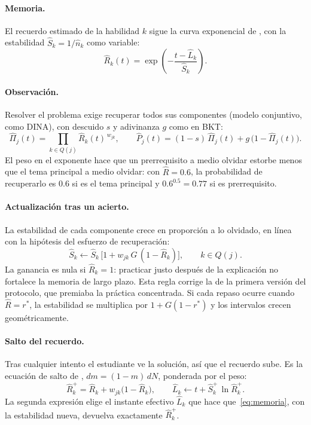 \documentclass[12pt]{article}
\theoremstyle{definition}
\newcommand{\Rh}{\hat R}
\newcommand{\Sh}{\hat S}
\newcommand{\Lh}{\hat L}
\newcommand{\Pih}{\hat\Pi}
\newcommand{\rstar}{r^{\ast}}
\begin{document}
\paragraph{Memoria.} El recuerdo estimado de la habilidad $k$ sigue la curva exponencial de \citet{tabibian2019}, con la estabilidad $\Sh_k=1/\hat n_k$ como variable:
\begin{equation}
\Rh_k(t)=\exp\!\left(-\frac{t-\Lh_k}{\Sh_k}\right).
\label{eq:memoria}
\end{equation}

\paragraph{Observación.} Resolver el problema exige recuperar todos sus componentes (modelo conjuntivo, como DINA), con descuido $s$ y adivinanza $g$ como en BKT:
\begin{equation}
\Pih_j(t)=\prod_{k\in Q(j)}\Rh_k(t)^{\,w_{jk}},\qquad
\hat P_j(t)=(1-s)\,\Pih_j(t)+g\,\bigl(1-\Pih_j(t)\bigr).
\label{eq:observacion}
\end{equation}
El peso en el exponente hace que un prerrequisito a medio olvidar estorbe menos que el tema principal a medio olvidar: con $\Rh=0.6$, la probabilidad de recuperarlo es $0.6$ si es el tema principal y $0.6^{0.5}=0.77$ si es prerrequisito.

\paragraph{Actualización tras un acierto.} La estabilidad de cada componente crece en proporción a lo olvidado, en línea con la hipótesis del esfuerzo de recuperación:
\begin{equation}
\Sh_k\leftarrow\Sh_k\,\bigl[1+w_{jk}\,G\,(1-\Rh_k)\bigr],\qquad k\in Q(j).
\label{eq:acierto}
\end{equation}
La ganancia es nula si $\Rh_k=1$: practicar justo después de la explicación no fortalece la memoria de largo plazo. Esta regla corrige la de la primera versión del protocolo, que premiaba la práctica concentrada. Si cada repaso ocurre cuando $\Rh=\rstar$, la estabilidad se multiplica por $1+G(1-\rstar)$ y los intervalos crecen geométricamente.

\paragraph{Salto del recuerdo.} Tras cualquier intento el estudiante ve la solución, así que el recuerdo sube. Es la ecuación de salto de \citet{tabibian2019}, $dm=(1-m)\,dN$, ponderada por el peso:
\begin{equation}
\Rh_k^{+}=\Rh_k+w_{jk}\bigl(1-\Rh_k\bigr),\qquad \Lh_k\leftarrow t+\Sh_k^{+}\,\ln\Rh_k^{+}.
\label{eq:salto}
\end{equation}
La segunda expresión elige el instante efectivo $\Lh_k$ que hace que~\eqref{eq:memoria}, con la estabilidad nueva, devuelva exactamente $\Rh_k^+$.
\end{document}
